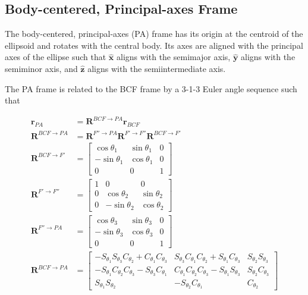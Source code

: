 \documentclass[]{article}
\newcommand{\vb}[1]{\bm{#1}} %
\newcommand{\vbh}[1]{\hat{\bm{#1}}} %
\begin{document}
\subsection{Body-centered, Principal-axes Frame}

The body-centered, principal-axes (PA) frame has its origin at the centroid of the ellipsoid and rotates with the central body. Its axes are aligned with the principal axes of the ellipse such that $\vbh{x}$ aligns with the semimajor axis, $\vbh{y}$ aligns with the semiminor axis, and $\vbh{z}$ aligns with the semiintermediate axis.

The PA frame is related to the BCF frame by a 3-1-3 Euler angle sequence such that

\begin{align}
	\vb{r}_{PA} &= \vb{R}^{BCF \rightarrow PA} \vb{r}_{BCF} \\
	\vb{R}^{BCF \rightarrow PA} &= \vb{R}^{F'' \rightarrow PA} \vb{R}^{F' \rightarrow F''} \vb{R}^{BCF \rightarrow F'} \\
	\vb{R}^{BCF \rightarrow F'} &= \left[ \begin{array}{ccc}
	\cos \theta_1 & \sin \theta_1 & 0 \\
	-\sin \theta_1 & \cos \theta_1 & 0 \\
	0 & 0 & 1
	\end{array} \right] \\
	\vb{R}^{F' \rightarrow F''} &= \left[ \begin{array}{ccc}
	1 & 0 & 0 \\
	0 & \cos \theta_2 & \sin \theta_2 \\
	0 & -\sin \theta_2 & \cos \theta_2
	\end{array} \right] \\
	\vb{R}^{F'' \rightarrow PA} &= \left[ \begin{array}{ccc}
	\cos \theta_3 & \sin \theta_3 & 0 \\
	-\sin \theta_3 & \cos \theta_3 & 0 \\
	0 & 0 & 1
	\end{array} \right] \\
	\label{eq:r_bcf2pa}
	\vb{R}^{BCF \rightarrow PA} &= \left[ \begin{array}{ccc}
	-S_{\theta_1} S_{\theta_3} C_{\theta_2} + C_{\theta_1} C_{\theta_3} & S_{\theta_3} C_{\theta_1} C_{\theta_2} + S_{\theta_1} C_{\theta_3} & S_{\theta_2} S_{\theta_3} \\
	-S_{\theta_1} C_{\theta_2} C_{\theta_3} - S_{\theta_3} C_{\theta_1} & C_{\theta_1} C_{\theta_2} C_{\theta_3} - S_{\theta_1} S_{\theta_3} & S_{\theta_2} C_{\theta_3} \\
	S_{\theta_1} S_{\theta_2} & -S_{\theta_2} C_{\theta_1} & C_{\theta_2}
	\end{array} \right]
\end{align}
\end{document}
